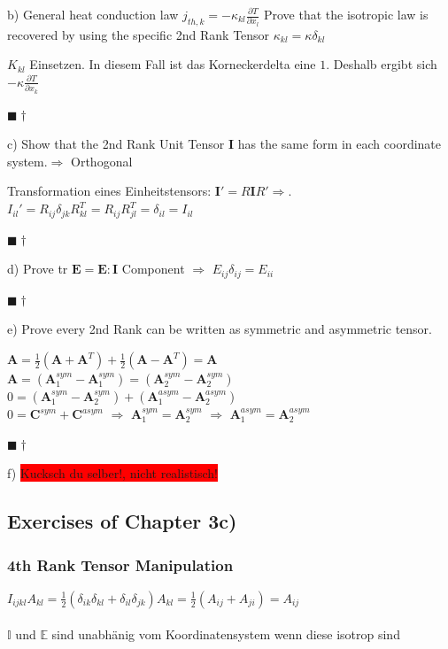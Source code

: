\documentclass[a4paper]{scrartcl}
\newcommand{\qed}{\begin{flushright}
$\blacksquare \dagger$ \end{flushright}}
\begin{document}
b) General heat conduction law $j_{th,k}=-\kappa_{kl}\frac{\partial
T}{\partial x_l}$ Prove that the isotropic law is recovered by using the
specific 2nd Rank Tensor $\kappa_{kl}=\kappa \delta_{kl}$

$K_{kl}$ Einsetzen. In diesem Fall ist das Korneckerdelta eine $1$. Deshalb
ergibt sich $-\kappa \frac{\partial T}{\partial x_k}$ \qed

c) Show that the 2nd Rank Unit Tensor $\mathbf{I}$ has the same form in each
coordinate system.$\Rightarrow$ Orthogonal

Transformation eines Einheitstensors: $\mathbf{I}'=R\mathbf{I}R'\Rightarrow$.
$I_{il}'=R_{ij}\delta_{jk}R_{kl}^T = R_{ij}R_{jl}^T=\delta_{il}=I_{il}$ \qed



d) Prove tr $\mathbf{E}=\mathbf{E : I}$
Component $\Rightarrow$ $E_{ij}\delta_{ij}=E_{ii}$ \qed

e) Prove every 2nd Rank can be written as symmetric and asymmetric tensor.

$\mathbf{A}=\frac{1}{2}\left(\mathbf{A} + \mathbf{A}^T\right)+
\frac{1}{2}\left(\mathbf{A}-\mathbf{A}^T\right) = \mathbf{A}$ \\
$\mathbf{A}=\left(\mathbf{A}_1^{sym}-\mathbf{A}_1^{sym}\right)=\left(\mathbf{A}_2^{sym}-\mathbf{A}_2^{sym}\right)$
\\
$0=\left(\mathbf{A}_1^{sym}-\mathbf{A}_2^{sym}\right)+\left(\mathbf{A}_1^{asym}-\mathbf{A}_2^{asym}\right)$
\\
$0=\mathbf{C}^{sym}+\mathbf{C}^{asym}$ $\Rightarrow$
$\mathbf{A}_1^{sym}=\mathbf{A}_2^{sym}$ $\Rightarrow$
$\mathbf{A}_1^{asym}=\mathbf{A}_2^{asym}$ \qed


f) \colorbox{red}{Kucksch du selber!, nicht realistisch!}




\subsection{Exercises of Chapter 3c)}

\subsubsection{4th Rank Tensor Manipulation}


$I_{ijkl}A_{kl}=\frac{1}{2}(\delta_{ik}\delta_{kl}+\delta_{il}\delta_{jk})A_{kl}=\frac{1}{2}(A_{ij}+A_{ji})=A_{ij}$
\\
\\
$ \mathbb{I} $ und $ \mathbb{E} $ sind unabhänig vom Koordinatensystem wenn diese isotrop sind
\end{document}

